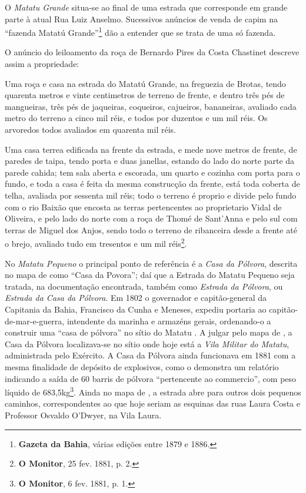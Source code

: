 O \textit{Matatu Grande} situa-se ao final de uma estrada que corresponde em grande parte à atual Rua Luiz Anselmo. Sucessivos anúncios de venda de capim na ``fazenda Matatú Grande''\footnote{\textbf{Gazeta da Bahia}, várias edições entre 1879 e 1886.} dão a entender que se trata de uma só fazenda.

O anúncio do leiloamento da roça de Bernardo Pires da Costa Chastinet descreve assim a propriedade:

\begin{citacao}
Uma roça e casa na estrada do Matatú Grande, na freguezia de Brotas, tendo quarenta metros e vinte centimetros de terreno de frente, e dentro três pés de mangueiras, três pés de jaqueiras, coqueiros, cajueiros, bananeiras, avaliado cada metro do terreno a cinco mil réis, e todos por duzentos e um mil réis. Os arvoredos todos avaliados em quarenta mil réis.

Uma casa terrea edificada na frente da estrada, e mede nove metros de frente, de paredes de taipa, tendo porta e duas janellas, estando do lado do norte parte da parede cahida; tem sala aberta e escorada, um quarto e cozinha com porta para o fundo, e toda a casa é feita da mesma construcção da frente, está toda coberta de telha, avaliada por sessenta mil réis; todo o terreno é proprio e divide pelo fundo com o rio Baixão que encosta as terras pertencentes ao proprietario Vidal de Oliveira, e pelo lado do norte com a roça de Thomé de Sant'Anna e pelo sul com terras de Miguel dos Anjos, sendo todo o terreno de ribanceira desde a frente até o brejo, avaliado tudo em tresentos e um mil réis\footnote{\textbf{O Monitor}, 25 fev. 1881, p. 2.}.
\end{citacao}

No \textit{Matatu Pequeno} o principal ponto de referência é a \textit{Casa da Pólvora}, descrita no mapa de  como ``Casa da Povora''; daí que a Estrada do Matatu Pequeno seja tratada, na documentação encontrada, também como \textit{Estrada da Pólvora}, ou \textit{Estrada da Casa da Pólvora}. Em 1802 o governador e capitão-general da Capitania da Bahia, Francisco da Cunha e Meneses, expediu portaria ao capitão-de-mar-e-guerra, intendente da marinha e armazéns gerais, ordenando-o a construir uma ``casa de pólvora'' no sítio do Matatu \cite[p.~93]{oliveira_ultramar_1977}. A julgar pelo mapa de , a Casa da Pólvora localizava-se no sítio onde hoje está a \textit{Vila Militar do Matatu}, administrada pelo Exército. A Casa da Pólvora ainda funcionava em 1881 com a mesma finalidade de depósito de explosivos, como o demonstra um relatório indicando a saída de 60 barris de pólvora ``pertencente ao commercio'', com peso líquido de 683,5kg\footnote{\textbf{O Monitor}, 6 fev. 1881, p. 1.}. Ainda no mapa de , a estrada abre para outros dois pequenos caminhos, correspondentes ao que hoje seriam as esquinas das ruas Laura Costa e Professor Osvaldo O'Dwyer, na Vila Laura.

